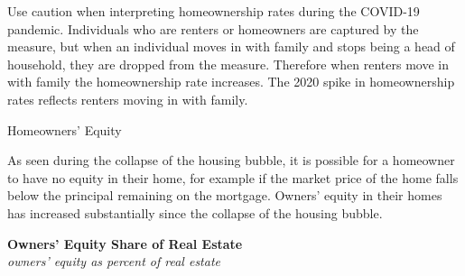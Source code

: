 \documentclass{report}
\makeatletter
\newcommand*\short[1]{\expandafter\@gobbletwo\number\numexpr#1\relax}
\newcommand{\shdateaxisticks}{
		date coordinates in=x, axis line style={draw=none},
		xmax={2024-01-31},
		max space between ticks=40,	    
		xtick={{1990-01-01}, {1995-01-01}, {2000-01-01}, 
			{2005-01-01}, {2010-01-01}, {2015-01-01}, {2020-01-01}},
		minor xtick={},
		enlarge y limits={0.06}, enlarge x limits={0.01},
		xticklabel style={align=center, yshift=-2pt}, tick label style={inner sep=0pt},
		}
\newcommand{\stdline}[4]{\addplot[very thick, no markers, color=#1] 
		table [x=#2, y=#3, col sep=comma] {#4};	}
\newcommand{\rbars}{
		\fill[color=black!10] (axis cs:{1990-07-01},\pgfkeysvalueof{/pgfplots/ymin})
			rectangle (axis cs:{1991-03-01}, \pgfkeysvalueof{/pgfplots/ymax});
		\fill[color=black!10] (axis cs:{2007-12-01},\pgfkeysvalueof{/pgfplots/ymin})
			rectangle (axis cs:{2009-07-01}, \pgfkeysvalueof{/pgfplots/ymax});
		\fill[color=black!10] (axis cs:{2001-03-01},\pgfkeysvalueof{/pgfplots/ymin})
			rectangle (axis cs:{2001-11-01}, \pgfkeysvalueof{/pgfplots/ymax});
		\fill[color=black!10] (axis cs:{2020-02-01},\pgfkeysvalueof{/pgfplots/ymin})
			rectangle (axis cs:{2020-05-01}, \pgfkeysvalueof{/pgfplots/ymax});}
\makeatother
\begin{document}
{\begin{minipage}{0.285\textwidth}

\end{minipage}\hspace{5mm}
\vspace{1mm}

\begin{minipage}{1.0\textwidth}
\small Use caution when interpreting homeownership rates during the COVID-19 pandemic. Individuals who are renters or homeowners are captured by the measure, but when an individual moves in with family and stops being a head of household, they are dropped from the measure. Therefore when renters move in with family the homeownership rate increases. The 2020 spike in homeownership rates reflects renters moving in with family. 
\vspace{1mm}

\normalsize Homeowners' Equity
\vspace*{-1mm}

\small As seen during the collapse of the housing bubble, it is possible for a homeowner to have no equity in their home, for example if the market price of the home falls below the principal remaining on the mortgage. Owners' equity in their homes has increased substantially since the collapse of the housing bubble. 
\end{minipage}

\begin{minipage}{0.265\textwidth}
\small 
\end{minipage}\hspace{7mm}
\begin{minipage}{0.45\textwidth} 
\vspace*{-4mm}

\normalsize \textbf{Owners' Equity Share of Real Estate}\\
\footnotesize{\textit{owners' equity as percent of real estate}}
\vspace{2.9cm}

\hspace{3mm} 


\end{minipage}}
\end{document}
